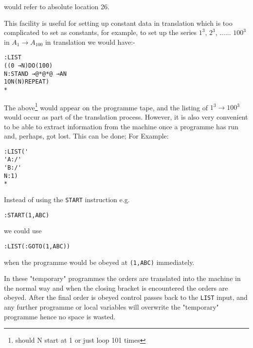 \documentclass[10pt, a4paper, oneside]{article}
\newcommand{\mytt}[1]{\texttt{\scriptsize #1}}
\newcommand{\mytt}[1]{\texttt{\small #1}}
\begin{document}
\begin{multicols}{2}
\begin{enumerate}
would refer to absolute location 26.

\end{enumerate}


This facility is useful for setting up constant
data in translation which is too complicated to set as
constants, for example, to set up the series $1^{3}$,
$2^{3}$, ...... $100^{3}$ in $A_{1} \rightarrow A_{100}$ in translation we would
have:-

\begin{addmargin}[1cm]{1em}%
\begin{lstlisting}
:LIST
((0 →N)DO(100)
N:STAND →@*@*@ →AN
1ON(N)REPEAT)
*
\end{lstlisting}
\end{addmargin}

The above\footnote{should N start at 1 or just loop 101 times} would appear on the programme tape, and
the listing of $1^{3} \rightarrow 100^{3}$ would occur as part of the
translation process.  However, it is also very convenient
to be able to extract information from the machine once
a programme has run and, perhaps, got lost. This can be
done; For Example:

\begin{addmargin}[1cm]{1em}%
\begin{lstlisting}
:LIST('
'A:/'
'B:/'
N:1)
*
\end{lstlisting}
\end{addmargin}

Instead of using the \mytt{START} instruction e.g.

\begin{addmargin}[1cm]{1em}%
\begin{lstlisting}
:START(1,ABC)
\end{lstlisting}
\end{addmargin}

\begin{flushleft}
we could use
\end{flushleft}

\begin{addmargin}[1cm]{1em}%
\begin{lstlisting}
:LIST(:GOTO(1,ABC))
\end{lstlisting}
\end{addmargin}

when the programme would be obeyed at \mytt{(1,ABC)}
immediately.

In these "temporary" programmes the orders are
translated into the machine in the normal way and when
the closing bracket is encountered the orders are obeyed.
After the final order is obeyed control passes back
to the \mytt{LIST} input, and any further programme or local
variables will overwrite the "temporary" programme
hence no space is wasted.


\end{multicols}
\end{document}
